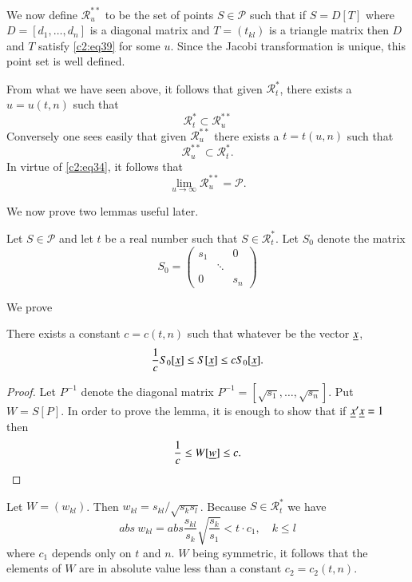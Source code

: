 We now define $\mathscr{R}^{\ast\ast}_{u}$ to be the set of points
$S\in \mathscr{P}$ such that if $S=D[T]$ where
$D=[d_{1},\ldots,d_{n}]$ is a diagonal matrix and $T=(t_{kl})$ is a
triangle matrix then $D$ and $T$ satisfy \eqref{c2:eq39} for some
$u$. Since the Jacobi transformation is unique, this point set is well
defined.

From what we have seen above, it follows that given
$\mathscr{R}^{\ast}_{t}$, there exists a $u=u(t,n)$ such that
$$
\mathscr{R}^{\ast}_{t}\subset \mathscr{R}^{\ast\ast}_{u}
$$
Conversely one sees easily that given $\mathscr{R}^{\ast\ast}_{u}$
there exists a $t=t(u,n)$ such that
$$
\mathscr{R}^{\ast\ast}_{u}\subset \mathscr{R}^{\ast}_{t}.
$$
In virtue of \eqref{c2:eq34}, it follows that
\begin{equation*}
\lim\limits_{u\to \infty}\mathscr{R}^{\ast\ast}_{u}=\mathscr{P}.\tag{40}\label{c2:eq40}
\end{equation*}\pageoriginale

We now prove two lemmas useful later.

Let $S\in\mathscr{P}$ and let $t$ be a real number such that
$S\in\mathscr{R}^{\ast}_{t}$. Let $S_{0}$ denote the matrix
\begin{equation*}
S_{0}=
\begin{pmatrix}
s_{1} & & 0\\
 & \ddots & \\
0 & & s_{n}
\end{pmatrix}\tag{41}\label{c2:eq41}
\end{equation*}

We prove

\begin{lem}\label{chap2:lem4}
There exists a constant $c=c(t,n)$ such that whatever be the vector
$\underline{x}$,
$$
\frac{1}{c}S_{0}[\underline{x}]\leq S[\underline{x}]\leq cS_{0}[\underline{x}].
$$
\end{lem}

\begin{proof}
Let $P^{-1}$ denote the diagonal matrix
$P^{-1}=[\sqrt{s_{1}},\ldots,\sqrt{s_{n}}]$. Put $W=S[P]$. In order to
prove the lemma, it is enough to show that if $\underline{x}'\underline{x}=1$ then
$$
\frac{1}{c}\leq W[\underline{w}]\leq c.
$$
\end{proof}

Let $W=(w_{kl})$. Then $w_{kl}=s_{kl}/\sqrt{s_{k}s_{l}}$. Because
$S\in\mathscr{R}^{\ast}_{t}$ we have
\begin{equation*}
abs\ w_{kl}=abs \frac{s_{kl}}{s_{k}}\sqrt{\dfrac{s_{k}}{s_{1}}}<t\cdot
c_{1},\quad k\leq l\tag{42}\label{c2:eq42}
\end{equation*}
where $c_{1}$ depends only on $t$ and $n$. $W$ being symmetric, it
follows that the elements of $W$ are in absolute value less than a
constant $c_{2}=c_{2}(t,n)$.


